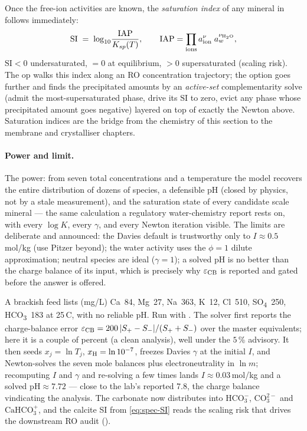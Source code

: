 \documentclass[11pt,a4paper]{article}
\begin{document}
Once the free-ion activities are known, the \emph{saturation index} of
any mineral in  follows immediately:
\begin{equation}
   \mathrm{SI} \;=\; \log_{10}\!\frac{\mathrm{IAP}}{K_{sp}(T)},
   \qquad
   \mathrm{IAP} = \prod_{\rm ions} a_{\rm ion}^{\nu}\;a_w^{\nu_{\rm H_2O}},
   \label{eq:spec-SI}
\end{equation}
$\mathrm{SI}<0$ undersaturated, $=0$ at equilibrium, $>0$ supersaturated
(scaling risk).  The  op walks this index along an RO
concentration trajectory; the  option goes further and
finds the precipitated amounts by an \emph{active-set} complementarity
solve (admit the most-supersaturated phase, drive its $\mathrm{SI}$ to
zero, evict any phase whose precipitated amount goes negative) layered on
top of exactly the Newton above.  Saturation indices are the bridge from
the chemistry of this section to the membrane and crystalliser chapters.

\paragraph{Power and limit.}  The power: from seven total
concentrations and a temperature the model recovers the entire
distribution of dozens of species, a defensible pH (closed by physics,
not by a stale measurement), and the saturation state of every candidate
scale mineral --- the same calculation a regulatory water-chemistry
report rests on, with every $\log K$, every $\gamma$, and every Newton
iteration visible.  The limits are deliberate and announced: the Davies
default is trustworthy only to $I\approx 0.5$\,mol/kg (use Pitzer
beyond); the water activity uses the $\phi=1$ dilute approximation;
neutral species are ideal ($\gamma=1$); a solved pH is no better than the
charge balance of its input, which is precisely why $\varepsilon_{\rm
CB}$ is reported and gated before the answer is offered.

\begin{example}
A brackish feed lists (mg/L) Ca~84, Mg~27, Na~363, K~12, Cl~510,
SO\textsubscript{4}~250, HCO\textsubscript{3}~183 at 25\,\textdegree C,
with no reliable pH.  Run with .  The solver first
reports the charge-balance error $\varepsilon_{\rm CB}=200\,|S_+ -
S_-|/(S_+ + S_-)$ over the master equivalents; here it is a couple of
percent (a clean analysis), well under the $5$\,\% advisory.  It then
seeds $x_j=\ln T_j$, $x_{\rm H}=\ln 10^{-7}$, freezes Davies $\gamma$ at
the initial $I$, and Newton-solves the seven mole balances plus
electroneutrality in $\ln m$; recomputing $I$ and $\gamma$ and re-solving
a few times lands $I\approx 0.03$\,mol/kg and a solved
$\mathrm{pH}\approx 7.72$ --- close to the lab's reported 7.8, the charge
balance vindicating the analysis.  The carbonate now distributes into
$\text{HCO}_3^-$, $\text{CO}_3^{2-}$ and $\text{CaHCO}_3^+$, and the
calcite SI from \eqref{eq:spec-SI} reads the scaling risk that drives the
downstream RO audit
().
\end{example}
\end{document}
